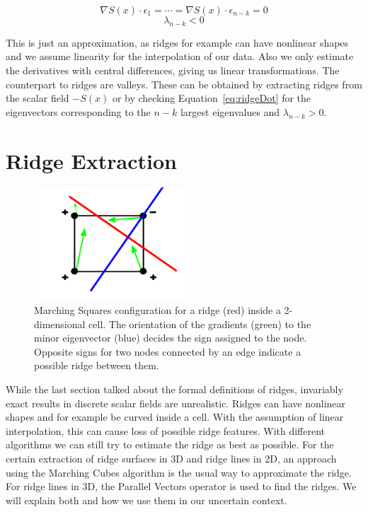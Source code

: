 \begin{equation}\label{eq:ridgeDot}
  \nabla S(x) \cdot \epsilon_1 = \cdots = \nabla S(x) \cdot \epsilon_{n-k} = 0
\end{equation}
\begin{equation}\label{eq:ridgeEV}
  \lambda_{n-k} < 0
\end{equation}

\noindent This is just an approximation, as ridges for example can have
nonlinear shapes and we assume linearity for the interpolation of our
data. Also we only estimate the derivatives with central differences,
giving us linear transformations. The counterpart to ridges are valleys.
These can be obtained by extracting ridges from the scalar field $-S(x)$
or by checking Equation~\ref{eq:ridgeDot} for the eigenvectors
corresponding to the $n-k$ largest eigenvalues and $\lambda_{n-k} > 0$.

\section{Ridge Extraction}

\begin{figure}[t]
  \centering
  \includegraphics[width=0.5\textwidth]{Images/MC.pdf}
  \caption{Marching Squares configuration for a ridge (red) inside a
  2-dimensional cell. The orientation of the gradients (green) to the
  minor eigenvector (blue) decides the sign assigned to the node.
  Opposite signs for two nodes connected by an edge indicate a
  possible ridge between them.}
  \label{fig:MC}
\end{figure}

While the last section talked about the formal definitions of ridges,
invariably exact results in discrete scalar fields are unrealistic.
Ridges can have nonlinear shapes and for example be curved inside a
cell. With the assumption of linear interpolation, this can cause loss
of possible ridge features. With different algorithms we can still try
to estimate the ridge as best as possible. For the certain extraction of
ridge surfaces in 3D and ridge lines in 2D, an approach using the
Marching Cubes algorithm is the usual way to approximate the ridge. For
ridge lines in 3D, the Parallel Vectors operator is used to find the
ridges. We will explain both and how we use them in our uncertain
context.

